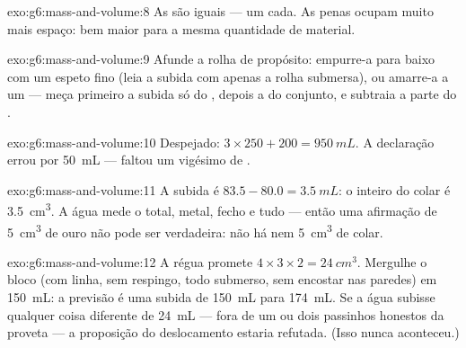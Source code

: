 \begin{solution}{exo:g6:mass-and-volume:8}
As  são iguais --- um  cada. As penas ocupam muito
mais espaço:  bem maior para a mesma quantidade de material.
\end{solution}

\begin{solution}{exo:g6:mass-and-volume:9}
Afunde a rolha de propósito: empurre-a para baixo com um espeto fino
(leia a subida com apenas a rolha submersa), ou amarre-a a um 
--- meça primeiro a subida só do , depois a do conjunto, e
subtraia a parte do .
\end{solution}

\begin{solution}{exo:g6:mass-and-volume:10}
Despejado: $3 \times 250 + 200 = \qty{950}{mL}$. A declaração errou
por \qty{50}{mL} --- faltou um vigésimo de .
\end{solution}

\begin{solution}{exo:g6:mass-and-volume:11}
A subida é $83.5 - 80.0 = \qty{3.5}{mL}$: o  inteiro do colar é
\qty{3.5}{cm^3}. A água mede o  total, metal, fecho e tudo ---
então uma afirmação de \qty{5}{cm^3} de ouro não pode ser verdadeira:
não há nem \qty{5}{cm^3} de colar.
\end{solution}

\begin{solution}{exo:g6:mass-and-volume:12}
A régua promete $4 \times 3 \times 2 = \qty{24}{cm^3}$. Mergulhe o
bloco (com linha, sem respingo, todo submerso, sem encostar nas
paredes) em \qty{150}{mL}: a previsão é uma subida de \qty{150}{mL}
para \qty{174}{mL}. Se a água subisse qualquer coisa diferente de
\qty{24}{mL} --- fora de um ou dois passinhos honestos da proveta ---
a proposição do deslocamento estaria refutada. (Isso nunca
aconteceu.)
\end{solution}

